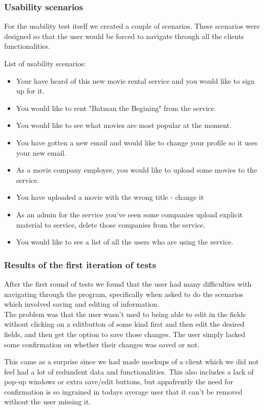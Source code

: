 \subsubsection{Usability scenarios}
\label{Design_GUI_Usability_scenarios}
For the usability test itself we created a couple of scenarios. These scenarios were designed so that the user would be forced to navigate through all the clients functionalities.

List of usability scenarios:
\begin{itemize}\addtolength{\itemsep}{-5pt}
\item Your have heard of this new movie rental service and you would like to sign up for it.
\item You would like to rent "Batman the Begining" from the service.
\item You would like to see what movies are most popular at the moment.
\item You have gotten a new email and would like to change your profile so it uses your new email.
\item As a movie company employee, you would like to upload some movies to the service.
\item You have uploaded a movie with the wrong title - change it
\item As an admin for the service you've seen some companies upload explicit material to service, delete those companies from the service.
\item You would like to see a list of all the users who are using the service.
\end {itemize}

\subsubsection[First Iteration]{Results of the first iteration of tests}
\label{Design_GUI_Usability_FirstIteration}
After the first round of tests we found that the user had many difficulties with navigating through the program, specifically when asked to do 
the scenarios which involved saving and editing of information.\\ 
The problem was that the user wasn't used to being able to edit in the fields without
clicking on a editbutton of some kind first and then edit the desired fields, and then get the option to save those changes.
The user simply lacked some confirmation on whether their changes was saved or not.

This came as a surprise since we had made mockups of a client which we did not feel had a lot of redundent data and functionalities. This also includes a lack of pop-up windows or extra save/edit buttons, but appafrently the need for confirmation is so ingrained in todays average user that it can't be removed without the user missing it.

